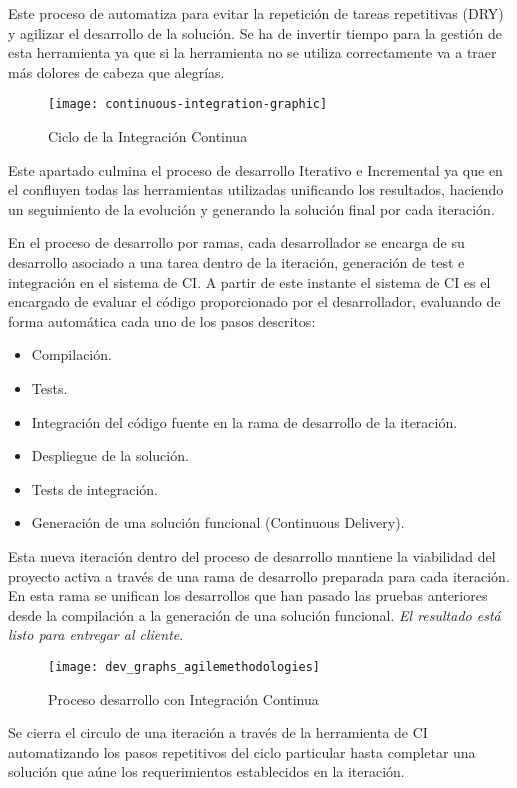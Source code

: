 \par Este proceso de automatiza para evitar la repetición de tareas repetitivas (DRY) y agilizar el desarrollo de la solución. Se ha de invertir tiempo para la gestión de esta herramienta ya que si la herramienta no se utiliza correctamente va a traer más dolores de cabeza que alegrías.

\begin{figure}[H]
    \centering
    \texttt{[image: continuous-integration-graphic]}
    \caption{Ciclo de la Integración Continua}
    \label{fig:continuous-integration-graphic}
\end{figure}

\par Este apartado culmina el proceso de desarrollo Iterativo e Incremental ya que en el confluyen todas las herramientas utilizadas unificando los resultados, haciendo un seguimiento de la evolución y generando la solución final por cada iteración.

\par En el proceso de desarrollo por ramas, cada desarrollador se encarga de su desarrollo asociado a una tarea dentro de la iteración, generación de test e integración en el sistema de CI. A partir de este instante el sistema de CI es el encargado de evaluar el código proporcionado por el desarrollador, evaluando de forma automática cada uno de los pasos descritos:

\begin{itemize}
	\item Compilación.
	\item Tests.
	\item Integración del código fuente en la rama de desarrollo de la iteración.
	\item Despliegue de la solución.
	\item Tests de integración.
	\item Generación de una solución funcional (Continuous Delivery).
\end{itemize}

\par Esta nueva iteración dentro del proceso de desarrollo mantiene la viabilidad del proyecto activa a través de una rama de desarrollo preparada para cada iteración. En esta rama se unifican los desarrollos que han pasado las pruebas anteriores desde la compilación a la generación de una solución funcional. \emph{El resultado está listo para entregar al cliente}.

\begin{figure}[H]
    \centering
    \texttt{[image: dev\_graphs\_agilemethodologies]}
    \caption{Proceso desarrollo con Integración Continua}
    \label{fig:dev_graphs_agilemethodologies}
\end{figure}

\par Se cierra el circulo de una iteración a través de la herramienta de CI automatizando los pasos repetitivos del ciclo particular hasta completar una solución que aúne los requerimientos establecidos en la iteración.


